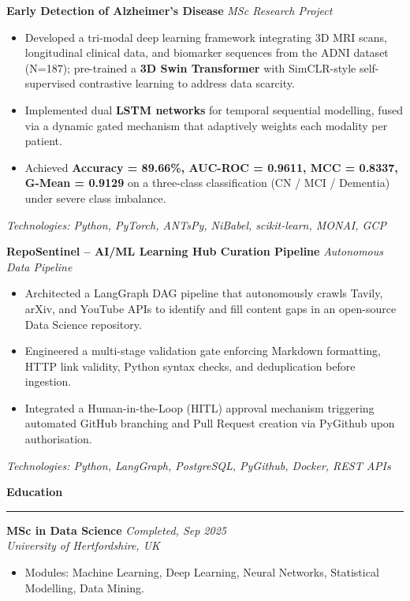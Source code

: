 \documentclass[a4paper,10pt]{article}
\newcommand{\sect}[1]{\vspace{8pt}\noindent\textbf{\color{heading}\large #1}\vspace{3pt}\hrule\vspace{6pt}}
\begin{document}
\noindent\textbf{Early Detection of Alzheimer's Disease} \hfill \textit{MSc Research Project}
\begin{itemize}[leftmargin=*, topsep=4pt, itemsep=2pt]
    \item Developed a tri-modal deep learning framework integrating 3D MRI scans, longitudinal clinical data, and biomarker sequences from the ADNI dataset (N=187); pre-trained a \textbf{3D Swin Transformer} with SimCLR-style self-supervised contrastive learning to address data scarcity.
    \item Implemented dual \textbf{LSTM networks} for temporal sequential modelling, fused via a dynamic gated mechanism that adaptively weights each modality per patient.
    \item Achieved \textbf{Accuracy = 89.66\%, AUC-ROC = 0.9611, MCC = 0.8337, G-Mean = 0.9129} on a three-class classification (CN / MCI / Dementia) under severe class imbalance.
\end{itemize}
\textit{Technologies: Python, PyTorch, ANTsPy, NiBabel, scikit-learn, MONAI, GCP}
\vspace{8pt}

\noindent\textbf{RepoSentinel -- AI/ML Learning Hub Curation Pipeline} \hfill \textit{Autonomous Data Pipeline}
\begin{itemize}[leftmargin=*, topsep=4pt, itemsep=2pt]
    \item Architected a LangGraph DAG pipeline that autonomously crawls Tavily, arXiv, and YouTube APIs to identify and fill content gaps in an open-source Data Science repository.
    \item Engineered a multi-stage validation gate enforcing Markdown formatting, HTTP link validity, Python syntax checks, and deduplication before ingestion.
    \item Integrated a Human-in-the-Loop (HITL) approval mechanism triggering automated GitHub branching and Pull Request creation via PyGithub upon authorisation.
\end{itemize}
\textit{Technologies: Python, LangGraph, PostgreSQL, PyGithub, Docker, REST APIs}

\sect{Education}
\noindent\textbf{MSc in Data Science} \hfill \textit{Completed, Sep 2025} \\
\textit{University of Hertfordshire, UK}
\begin{itemize}[leftmargin=*, topsep=2pt, itemsep=0pt]
    \item Modules: Machine Learning, Deep Learning, Neural Networks, Statistical Modelling, Data Mining.
\end{itemize}
\vspace{4pt}
\end{document}
